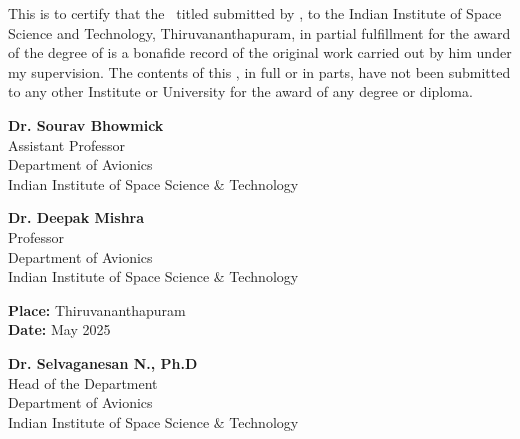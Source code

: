 This is to certify that the \Doctype\ titled \textbf{\textit{\Title}}
submitted by {\bf\Author}, to the Indian Institute of Space Science and
Technology, Thiruvananthapuram, in partial fulfillment for the award of the
degree of {\bf\Degreetext} is a bonafide record of the original work carried
out by him under my supervision. The contents of this \Doctype, in full or
in parts, have not been submitted to any other Institute or University for
the award of any degree or diploma.

\vspace{8mm}

\noindent
\begin{minipage}{0.52\textwidth}
\textbf{Dr. Sourav Bhowmick}\\
Assistant Professor\\
Department of Avionics\\
Indian Institute of Space Science \& Technology\\

\end{minipage}
\hfill
\begin{minipage}{0.48\textwidth}
\raggedleft
\textbf{Dr. Deepak Mishra}\\
Professor\\
Department of Avionics\\
Indian Institute of Space Science \& Technology\\

\end{minipage}

\vspace{15mm}

\noindent
\begin{minipage}{0.5\textwidth}
\textbf{Place:} Thiruvananthapuram \\
\textbf{Date:} May 2025
\end{minipage}
\hfill
\begin{minipage}{0.45\textwidth}
\raggedleft
\textbf{Dr. Selvaganesan N., Ph.D}\\
Head of the Department\\
Department of Avionics\\
Indian Institute of Space Science \& Technology\\

\end{minipage}
